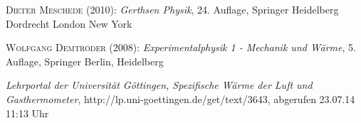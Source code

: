 \documentclass[12pt,a4paper,titlepage,headinclude,bibtotoc]{scrartcl}
\begin{document}
\begin{thebibliography}{100}

	\textsc{Dieter Meschede} (2010): \emph{Gerthsen Physik}, 24. Auflage, Springer Heidelberg
Dordrecht London New York

\textsc{Wolfgang Demtröder} (2008): \emph{Experimentalphysik 1 - Mechanik und Wärme}, 5. Auflage, Springer Berlin, Heidelberg

	\emph{Lehrportal der Universität Göttingen, Spezifische Wärme der Luft und Gasthermometer},
  http://lp.uni-goettingen.de/get/text/3643, abgerufen 23.07.14 11:13 Uhr

\end{thebibliography}
\end{document}
